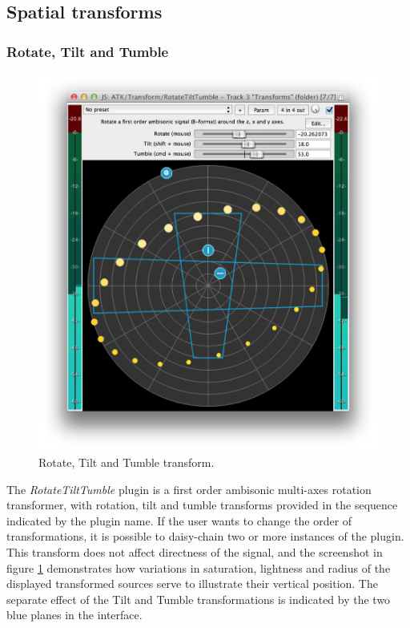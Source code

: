 \documentclass{article}
\begin{document}


\subsection{Spatial transforms}\label{sec:transforms}

\subsubsection{Rotate, Tilt and Tumble}\label{sec:rotate}

\begin{figure}[h]
\captionsetup{aboveskip=-6pt}
\centering
\includegraphics[width=0.9\columnwidth]{figures/rotateTiltTumble.png}
\setlength{\abovecaptionskip}{0pt plus 3pt minus 2pt} %
\caption{Rotate, Tilt and Tumble transform.\label{fig:rotateTransform}}
\end{figure}

The \emph{RotateTiltTumble} plugin is a first order ambisonic multi-axes rotation transformer, with rotation, tilt and tumble transforms provided in the sequence indicated by the plugin name.
If the user wants to change the order of transformations, it is possible to daisy-chain two or more instances of the plugin.
This transform does not affect directness of the signal, and the screenshot in figure \ref{fig:rotateTransform} demonstrates how variations in saturation, lightness and radius of the displayed transformed sources serve to illustrate their vertical position. The separate effect of the Tilt and Tumble transformations is indicated by the two blue planes in the interface.
\end{document}
